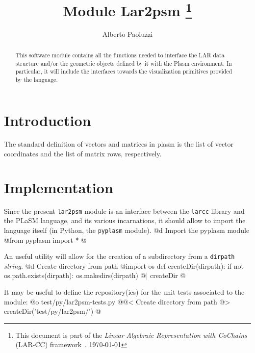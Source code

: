 \documentclass[11pt,oneside]{article}	%
\title{Module Lar2psm
\footnote{This document is part of the \emph{Linear Algebraic Representation with CoChains} (LAR-CC) framework~\cite{cclar-proj:2013:00}. \today}
}
\author{Alberto Paoluzzi}
\begin{document}
\maketitle

\begin{abstract}
This software module contains all the functions needed to interface the LAR data structure and/or the geometric  objects defined by it with the Plasm environment. In particular, it will include the interfaces towards the visualization primitives provided by the language.
\end{abstract}



\tableofcontents
\newpage

\section{Introduction}
The standard definition of vectors and matrices in plasm is the list of vector coordinates and the list of matrix rows, respectively.

\section{Implementation}

Since the present \texttt{lar2psm} module is an interface between the \texttt{larcc} library and the PLaSM language, and its various incarnations, it should allow to import the language itself (in Python, the \texttt{pyplasm} module). 
@d Import the pyplasm module
@{from pyplasm import * 
@}

An useful utility will allow for the creation of a subdirectory from a \texttt{dirpath} \emph{string}.
@d Create directory from path 
@{import os
def createDir(dirpath):
    if not os.path.exists(dirpath):
        os.makedirs(dirpath)
@| createDir @}

It may be useful to define the repository(ies) for the unit tests associated to the module:
@o test/py/lar2psm-tests.py
@{@< Create directory from path @>
createDir('test/py/lar2psm/')
@}
\end{document}
